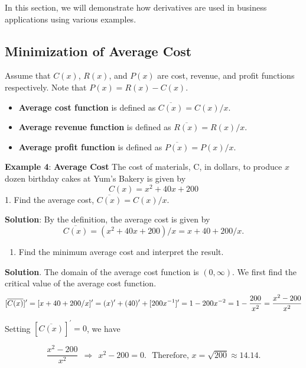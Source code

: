 \documentclass[
]{book}
\providecommand{\tightlist}{%
  \setlength{\itemsep}{0pt}\setlength{\parskip}{0pt}}
\begin{document}
In this section, we will demonstrate how derivatives are used in business applications using various examples.

\hfill\break

\hypertarget{minimization-of-average-cost}{%
\subsection{Minimization of Average Cost}\label{minimization-of-average-cost}}

Assume that \(C(x)\), \(R(x)\), and \(P(x)\) are cost, revenue, and profit functions respectively. Note that \(P(x) = R(x) - C(x)\).

\begin{itemize}
\item
  \textbf{Average cost function} is defined as \(\overline{C(x)} = C(x) / x\).
\item
  \textbf{Average revenue function} is defined as \(\overline{R(x)} = R(x) / x\).
\item
  \textbf{Average profit function} is defined as \(\overline{P(x)} = P(x) / x\).
\end{itemize}

\hfill\break

\textbf{Example 4}: \textbf{Average Cost} The cost of materials, C, in dollars, to produce \(x\) dozen birthday cakes at Yum's Bakery is given by
\[
C(x) = x^2 + 40 x + 200
\]
1. Find the average cost, \(\overline{C(x)} = C(x)/x\).

\textbf{Solution}: By the definition, the average cost is given by
\[
\overline{C(x)} = (x^2 + 40 x + 200)/x = x + 40 + 200/x.
\]

\hfill\break

\begin{enumerate}
\def\labelenumi{\arabic{enumi}.}
\setcounter{enumi}{1}
\tightlist
\item
  Find the minimum average cost and interpret the result.
\end{enumerate}

\textbf{Solution}. The domain of the average cost function is \((0, \infty)\). We first find the critical value of the average cost function.
\[
[\overline{C(x)}]^\prime = [x + 40 + 200/x]^\prime = (x)^\prime + (40)^\prime + [200x^{-1}]^\prime \\ =
1 -200x^{-2} = 1-\frac{200}{x^2} = \frac{x^2-200}{x^2}
\]

Setting \([\overline{C(x)}]^\prime = 0\), we have

\[
\frac{x^2-200}{x^2} ~~\Rightarrow~~ x^2 - 200 = 0. ~~~\text{Therefore, } x = \sqrt{200} \approx 14.14.
\]
\end{document}
